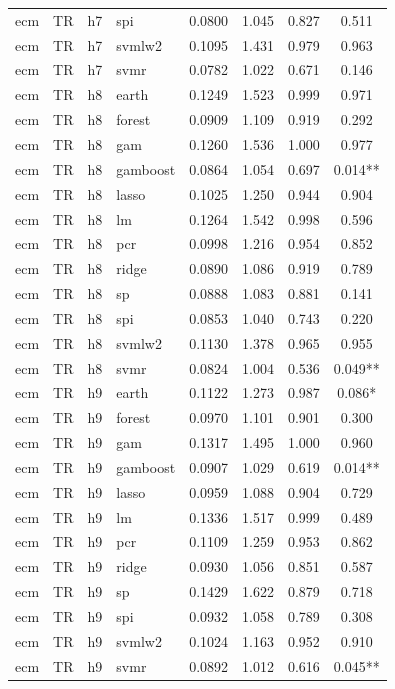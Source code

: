 \begin{ThreePartTable}
\begin{longtable}[t]{llclcccc}
ecm & TR & h7 & spi & 0.0800 & 1.045 & 0.827 & 0.511\\
ecm & TR & h7 & svmlw2 & 0.1095 & 1.431 & 0.979 & 0.963\\
ecm & TR & h7 & svmr & 0.0782 & 1.022 & 0.671 & 0.146\\
\addlinespace
ecm & TR & h8 & earth & 0.1249 & 1.523 & 0.999 & 0.971\\
ecm & TR & h8 & forest & 0.0909 & 1.109 & 0.919 & 0.292\\
ecm & TR & h8 & gam & 0.1260 & 1.536 & 1.000 & 0.977\\
ecm & TR & h8 & gamboost & 0.0864 & 1.054 & 0.697 & 0.014**\\
ecm & TR & h8 & lasso & 0.1025 & 1.250 & 0.944 & 0.904\\
ecm & TR & h8 & lm & 0.1264 & 1.542 & 0.998 & 0.596\\
ecm & TR & h8 & pcr & 0.0998 & 1.216 & 0.954 & 0.852\\
ecm & TR & h8 & ridge & 0.0890 & 1.086 & 0.919 & 0.789\\
ecm & TR & h8 & sp & 0.0888 & 1.083 & 0.881 & 0.141\\
ecm & TR & h8 & spi & 0.0853 & 1.040 & 0.743 & 0.220\\
ecm & TR & h8 & svmlw2 & 0.1130 & 1.378 & 0.965 & 0.955\\
ecm & TR & h8 & svmr & 0.0824 & 1.004 & 0.536 & 0.049**\\
\addlinespace
ecm & TR & h9 & earth & 0.1122 & 1.273 & 0.987 & 0.086*\\
ecm & TR & h9 & forest & 0.0970 & 1.101 & 0.901 & 0.300\\
ecm & TR & h9 & gam & 0.1317 & 1.495 & 1.000 & 0.960\\
ecm & TR & h9 & gamboost & 0.0907 & 1.029 & 0.619 & 0.014**\\
ecm & TR & h9 & lasso & 0.0959 & 1.088 & 0.904 & 0.729\\
ecm & TR & h9 & lm & 0.1336 & 1.517 & 0.999 & 0.489\\
ecm & TR & h9 & pcr & 0.1109 & 1.259 & 0.953 & 0.862\\
ecm & TR & h9 & ridge & 0.0930 & 1.056 & 0.851 & 0.587\\
ecm & TR & h9 & sp & 0.1429 & 1.622 & 0.879 & 0.718\\
ecm & TR & h9 & spi & 0.0932 & 1.058 & 0.789 & 0.308\\
ecm & TR & h9 & svmlw2 & 0.1024 & 1.163 & 0.952 & 0.910\\
ecm & TR & h9 & svmr & 0.0892 & 1.012 & 0.616 & 0.045**\\

\end{longtable}
\end{ThreePartTable}
